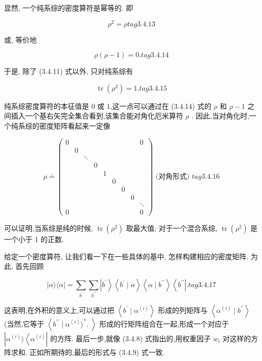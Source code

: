 显然, 一个纯系综的密度算符是幂等的. 即

$$
{\rho }^{2} = \rho tag{3. 4.13}
$$

或, 等价地

$$
\rho \left( {\rho - 1}\right) = 0. tag{3. 4.14}
$$

于是, 除了 (3.4.11) 式以外, 只对纯系综有

$$
\operatorname{tr}\left( {\rho }^{2}\right) = 1\text{.} tag{3. 4.15}
$$

纯系综密度算符的本征值是 0 或 1,这一点可以通过在 (3.4.14) 式的 $\rho$ 和 $\rho - 1$ 之间插入一个基右矢完全集合看到,该集合能对角化厄米算符 $\rho$ . 因此,当对角化时,一个纯系综的密度矩阵看起来一定像

$$
\rho \doteq \left( \begin{matrix} 0 & & & & & & & & 0 \\ & 0 & & & & & & & \\ & & \ddots & & & & & & \\ & & & 0 & & & & & \\ & & & & 1 & & & & \\ & & & & & 0 & & & \\ & & & & & & 0 & & \\ & & & & & & & 0 & \\ & & & & & & & & \ddots \\ 0 & & & & & & & & 0 \end{matrix}\right) \text{ (对角形式) } tag{3. 4.16}
$$

可以证明,当系综是纯的时候, $\operatorname{tr}\left( {\rho }^{2}\right)$ 取最大值; 对于一个混合系综, $\operatorname{tr}\left( {\rho }^{2}\right)$ 是一个小于 1 的正数.

给定一个密度算符, 让我们看一下在一些具体的基中, 怎样构建相应的密度矩阵. 为此, 首先回顾

$$
\left| {\alpha \rangle \langle \alpha }\right| = \mathop{\sum }\limits_{{b}^{\prime }}\mathop{\sum }\limits_{{b}^{\prime \prime }}\left| {b}^{\prime }\right\rangle \left\langle {{b}^{\prime } \mid \alpha }\right\rangle \left\langle {\alpha \mid {b}^{\prime \prime }}\right\rangle \left\langle {b}^{\prime \prime }\right| . tag{3. 4.17}
$$

这表明,在外积的意义上,可以通过把 $\left\langle {{b}^{\prime } \mid {\alpha }^{\left( i\right) }}\right\rangle$ 形成的列矩阵与 $\left\langle {{\alpha }^{\left( i\right) } \mid {b}^{\prime \prime }}\right\rangle$ (当然,它等于 $\left\langle {{b}^{\prime \prime } \mid {\alpha }^{\left( i\right) }{\rangle }^{ * }\text{. }}\right\rangle$ 形成的行矩阵组合在一起,形成一个对应于 $\left| {{\alpha }^{\left( i\right) }\rangle \left\langle {\alpha }^{\left( i\right) }\right. }\right|$ 的方阵. 最后一步,就像 (3.4.8) 式指出的,用权重因子 ${w}_{i}$ 对这样的方阵求和. 正如所期待的,最后的形式与 (3.4.9) 式一致.

